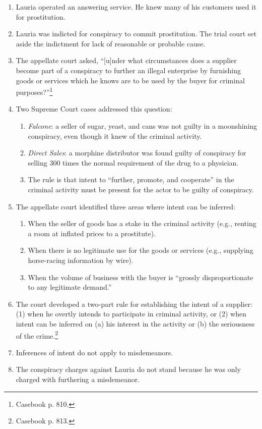 \begin{enumerate}
    \item Lauria operated an answering service. He knew many of his customers 
    used it for prostitution.
    \item Lauria was indicted for conspiracy to commit prostitution. The trial 
    court set aside the indictment for lack of reasonable or probable cause.
    \item The appellate court asked, ``[u]nder what circumstances does a 
    supplier become part of a conspiracy to further an illegal enterprise by 
    furnishing goods or services which he knows are to be used by the buyer 
    for criminal purposes?''\footnote{Casebook p. 810.}
    \item Two Supreme Court cases addressed this question:
    \begin{enumerate}
        \item \emph{Falcone}: a seller of sugar, yeast, and cans was not 
        guilty in a moonshining conspiracy, even though it knew of the 
        criminal activity.
        \item \emph{Direct Sales}: a morphine distributor was found guilty of 
        conspiracy for selling 300 times the normal requirement of the drug to 
        a physician.  \item The rule is that intent to ``further, promote, and 
        cooperate'' in the criminal activity must be present for the actor to 
        be guilty of conspiracy.
    \end{enumerate}
    \item The appellate court identified three areas where intent can be 
    inferred:
    \begin{enumerate}
        \item When the seller of goods has a stake in the criminal activity 
        (e.g., renting a room at inflated prices to a prostitute).
        \item When there is no legitimate use for the goods or services (e.g., 
        supplying horse-racing information by wire).
        \item When the volume of business with the buyer is ``grossly 
        disproportionate to any legitimate demand.''
    \end{enumerate}
    \item The court developed a two-part rule for establishing the intent of a 
    supplier: (1) when he overtly intends to participate in criminal activity, 
    or (2) when intent can be inferred on (a) his interest in the activity or 
    (b) the seriousness of the crime.\footnote{Casebook p. 813.}
    \item Inferences of intent do not apply to misdemeanors.
    \item The conspiracy charges against Lauria do not stand because he was 
    only charged with furthering a misdemeanor.
\end{enumerate}

